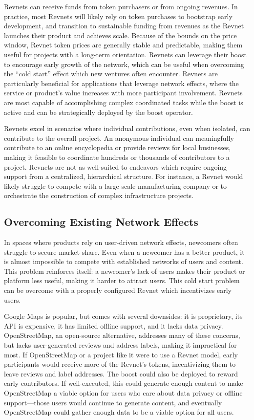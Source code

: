 \documentclass{article}
\begin{document}
Revnets can receive funds from token purchasers or from ongoing revenues. In practice, most Revnets will likely rely on token purchases to bootstrap early development, and transition to sustainable funding from revenues as the Revnet launches their product and achieves scale. Because of the bounds on the price window, Revnet token prices are generally stable and predictable, making them useful for projects with a long-term orientation. Revnets can leverage their boost to encourage early growth of the network, which can be useful when overcoming the ``cold start'' effect which new ventures often encounter. Revnets are particularly beneficial for applications that leverage network effects, where the service or product's value increases with more participant involvement. Revnets are most capable of accomplishing complex coordinated tasks while the boost is active and can be strategically deployed by the boost operator.

Revnets excel in scenarios where individual contributions, even when isolated, can contribute to the overall project. An anonymous individual can meaningfully contribute to an online encyclopedia or provide reviews for local businesses, making it feasible to coordinate hundreds or thousands of contributors to a project. Revnets are not as well-suited to endeavors which require ongoing support from a centralized, hierarchical structure. For instance, a Revnet would likely struggle to compete with a large-scale manufacturing company or to orchestrate the construction of complex infrastructure projects.

\subsection{Overcoming Existing Network Effects}

In spaces where products rely on user-driven network effects, newcomers often struggle to secure market share. Even when a newcomer has a better product, it is almost impossible to compete with established networks of users and content. This problem reinforces itself: a newcomer's lack of users makes their product or platform less useful, making it harder to attract users. This cold start problem can be overcome with a properly configured Revnet which incentivizes early users.

Google Maps is popular, but comes with several downsides: it is proprietary, its API is expensive, it has limited offline support, and it lacks data privacy. OpenStreetMap, an open-source alternative, addresses many of these concerns, but lacks user-generated reviews and address labels, making it impractical for most. If OpenStreetMap or a project like it were to use a Revnet model, early participants would receive more of the Revnet's tokens, incentivizing them to leave reviews and label addresses. The boost could also be deployed to reward early contributors. If well-executed, this could generate enough content to make OpenStreetMap a viable option for users who care about data privacy or offline support---those users would continue to generate content, and eventually OpenStreetMap could gather enough data to be a viable option for all users.
\end{document}

